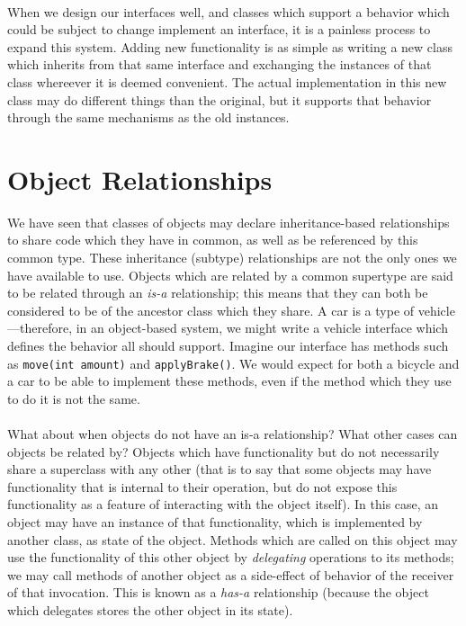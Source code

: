 \documentclass{article}
\begin{document}
\paragraph{}
When we design our interfaces well, and classes which support a behavior which
could be subject to change implement an interface, it is a painless process to 
expand this system. Adding new functionality is as simple as writing a new
class which inherits from that same interface and exchanging the instances of
that class whereever it is deemed convenient. The actual implementation in 
this new class may do different things than the original, but it supports
that behavior through the same mechanisms as the old instances.

\section{Object Relationships}
We have seen that classes of objects may declare inheritance-based relationships 
to share code which they have in common, as well as be referenced by this common
type. These inheritance (subtype) relationships are not the only ones we have
available to use. Objects which are related by a common supertype are said to
be related through an \textit{is-a} relationship; this means that they can both
be considered to be of the ancestor class which they share. A car is a type of
vehicle---therefore, in an object-based system, we might write a vehicle 
interface which defines the behavior all should support. Imagine our interface
has methods such as \texttt{move(int amount)} and \texttt{applyBrake()}. We would
expect for both a bicycle and a car to be able to implement these methods, even
if the method which they use to do it is not the same.
\paragraph{}
What about when objects do not have an is-a relationship? What other cases can
objects be related by? Objects which have functionality but do not necessarily
share a superclass with any other (that is to say that some objects may have
functionality that is internal to their operation, but do not expose this 
functionality as a feature of interacting with the object itself). In this case,
an object may have an instance of that functionality, which is implemented by
another class, as state of the object. Methods which are called on this object
may use the functionality of this other object by \textit{delegating} operations 
to its methods; we may call methods of another object as a side-effect of behavior
of the receiver of that invocation. This is known as a \textit{has-a} relationship
(because the object which delegates stores the other object in its state).
\end{document}
